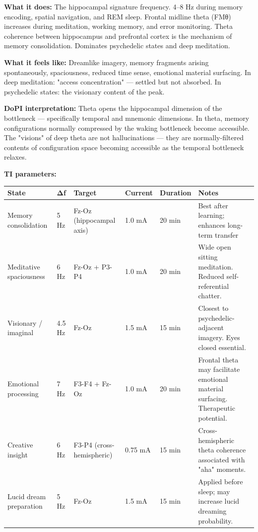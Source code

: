 \textbf{What it does:} The hippocampal signature frequency. 4–8 Hz during memory encoding, spatial navigation, and REM sleep. Frontal midline theta (FMθ) increases during meditation, working memory, and error monitoring. Theta coherence between hippocampus and prefrontal cortex is the mechanism of memory consolidation. Dominates psychedelic states and deep meditation.


\textbf{What it feels like:} Dreamlike imagery, memory fragments arising spontaneously, spaciousness, reduced time sense, emotional material surfacing. In deep meditation: "access concentration" — settled but not absorbed. In psychedelic states: the visionary content of the peak.


\textbf{DoPI interpretation:} Theta opens the hippocampal dimension of the bottleneck — specifically temporal and mnemonic dimensions. In theta, memory configurations normally compressed by the waking bottleneck become accessible. The "visions" of deep theta are not hallucinations — they are normally-filtered contents of configuration space becoming accessible as the temporal bottleneck relaxes.


\textbf{TI parameters:}



\begin{longtable}{p{} p{} p{} p{} p{} p{}}
\toprule
\textbf{State} & \textbf{Δf} & \textbf{Target} & \textbf{Current} & \textbf{Duration} & \textbf{Notes} \\
\midrule
\endhead
Memory consolidation & 5 Hz & Fz-Oz (hippocampal axis) & 1.0 mA & 20 min & Best after learning; enhances long-term transfer \\
Meditative spaciousness & 6 Hz & Fz-Oz + P3-P4 & 1.0 mA & 20 min & Wide open sitting meditation. Reduced self-referential chatter. \\
Visionary / imaginal & 4.5 Hz & Fz-Oz & 1.5 mA & 15 min & Closest to psychedelic-adjacent imagery. Eyes closed essential. \\
Emotional processing & 7 Hz & F3-F4 + Fz-Oz & 1.0 mA & 20 min & Frontal theta may facilitate emotional material surfacing. Therapeutic potential. \\
Creative insight & 6 Hz & F3-P4 (cross-hemispheric) & 0.75 mA & 15 min & Cross-hemispheric theta coherence associated with "aha" moments. \\
Lucid dream preparation & 5 Hz & Fz-Oz & 1.5 mA & 15 min & Applied before sleep; may increase lucid dreaming probability. \\
\bottomrule
\end{longtable}



